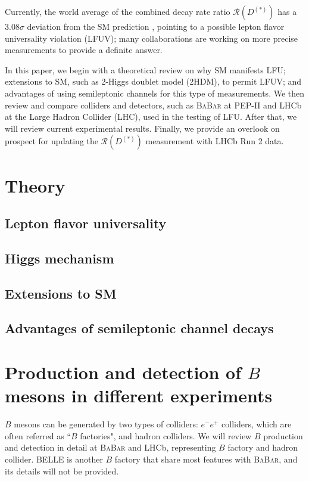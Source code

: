 \documentclass[12pt,letterpaper]{article}
\def\BaBar/{\textsc{BaBar}}
\def\RDDst/{\ensuremath{\mathcal{R}(D^{(*)})}}
\begin{document}
Currently, the world average of the combined decay rate ratio \RDDst/
has a $3.08\sigma$ deviation from the SM prediction \cite{HFLAV:2019}, pointing
to a possible lepton flavor universality violation (LFUV);
many collaborations are working on more precise measurements to provide a
definite answer.

In this paper, we begin with a theoretical review on why SM manifests LFU;
extensions to SM, such as 2-Higgs doublet model (2HDM), to permit LFUV;
and advantages of using semileptonic channels for this type of measurements.
We then review and compare colliders and detectors, such as \BaBar/ at PEP-II
and LHCb at the Large Hadron Collider (LHC), used in the testing of LFU.
After that, we will review current experimental results.
Finally, we provide an overlook on prospect for updating the \RDDst/ measurement with LHCb Run
2 data.

\section{Theory}
\subsection{Lepton flavor universality} \label{sec:lfu}


\subsection{Higgs mechanism}


\subsection{Extensions to SM}

\subsection{Advantages of semileptonic channel decays}

\section{Production and detection of $B$ mesons in different experiments}
$B$ mesons can be generated by two types of colliders:
$e^- e^+$ colliders, which are often referred as ``$B$ factories", and hadron colliders.
We will review $B$ production and detection in detail at \BaBar/ and LHCb, representing $B$ factory and hadron collider.
BELLE is another $B$ factory that share most features with \BaBar/, and its details will not be provided.
\end{document}
